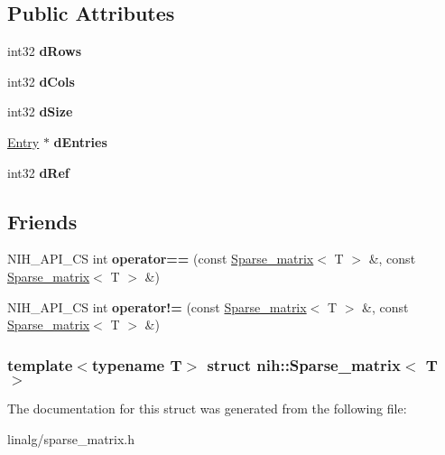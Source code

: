 \subsection*{\-Public \-Attributes}
\begin{DoxyCompactItemize}
\item 
\hypertarget{structnih_1_1_sparse__matrix_acf8b6ee733e537017a67a2b16fde7bb4}{
int32 {\bfseries d\-Rows}}
\label{structnih_1_1_sparse__matrix_acf8b6ee733e537017a67a2b16fde7bb4}

\item 
\hypertarget{structnih_1_1_sparse__matrix_a8992940bbdf71f634b1903d997364561}{
int32 {\bfseries d\-Cols}}
\label{structnih_1_1_sparse__matrix_a8992940bbdf71f634b1903d997364561}

\item 
\hypertarget{structnih_1_1_sparse__matrix_a5b7bca68a2f05719abc0872628666996}{
int32 {\bfseries d\-Size}}
\label{structnih_1_1_sparse__matrix_a5b7bca68a2f05719abc0872628666996}

\item 
\hypertarget{structnih_1_1_sparse__matrix_a41252150eaca79bcd22e4d88ae8a696c}{
\hyperlink{structnih_1_1_sparse__matrix__entry}{\-Entry} $\ast$ {\bfseries d\-Entries}}
\label{structnih_1_1_sparse__matrix_a41252150eaca79bcd22e4d88ae8a696c}

\item 
\hypertarget{structnih_1_1_sparse__matrix_a562712ea777668659a10162247356b0f}{
int32 {\bfseries d\-Ref}}
\label{structnih_1_1_sparse__matrix_a562712ea777668659a10162247356b0f}

\end{DoxyCompactItemize}
\subsection*{\-Friends}
\begin{DoxyCompactItemize}
\item 
\hypertarget{structnih_1_1_sparse__matrix_af5397d90bf7019ac0de74af23156e628}{
\-N\-I\-H\-\_\-\-A\-P\-I\-\_\-\-C\-S int {\bfseries operator==} (const \hyperlink{structnih_1_1_sparse__matrix}{\-Sparse\-\_\-matrix}$<$ \-T $>$ \&, const \hyperlink{structnih_1_1_sparse__matrix}{\-Sparse\-\_\-matrix}$<$ \-T $>$ \&)}
\label{structnih_1_1_sparse__matrix_af5397d90bf7019ac0de74af23156e628}

\item 
\hypertarget{structnih_1_1_sparse__matrix_af0a54b9f876f340e435b4ac13b3dc9ac}{
\-N\-I\-H\-\_\-\-A\-P\-I\-\_\-\-C\-S int {\bfseries operator!=} (const \hyperlink{structnih_1_1_sparse__matrix}{\-Sparse\-\_\-matrix}$<$ \-T $>$ \&, const \hyperlink{structnih_1_1_sparse__matrix}{\-Sparse\-\_\-matrix}$<$ \-T $>$ \&)}
\label{structnih_1_1_sparse__matrix_af0a54b9f876f340e435b4ac13b3dc9ac}

\end{DoxyCompactItemize}
\subsubsection*{template$<$typename \-T$>$ struct nih\-::\-Sparse\-\_\-matrix$<$ T $>$}



\-The documentation for this struct was generated from the following file\-:\begin{DoxyCompactItemize}
\item 
linalg/sparse\-\_\-matrix.\-h\end{DoxyCompactItemize}
